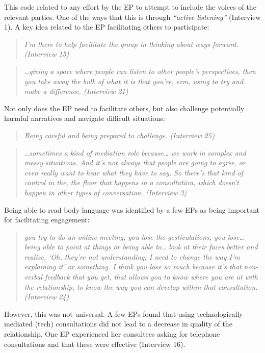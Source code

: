 \documentclass[
  english,
  man]{apa7}
\begin{document}
This code related to any effort by the EP to attempt to include the voices of the relevant parties. One of the ways that this is through \emph{``active listening''} (Interview 1). A key idea related to the EP facilitating others to participate:

\begin{quote}
\emph{I'm there to help facilitate the group in thinking about ways
forward. (Interview 15)}
\end{quote}

\begin{quote}
\emph{\ldots giving a space where people can listen to other people's
perspectives, then you take away the bulk of what it is that you're,
erm, using to try and make a difference. (Interview 21)}
\end{quote}

Not only does the EP need to facilitate others, but also challenge
potentially harmful narratives and navigate difficult situations:

\begin{quote}
\emph{Being careful and being prepared to challenge. (Interview 25)}
\end{quote}

\begin{quote}
\emph{\ldots sometimes a kind of mediation role because\ldots{} we work in complex
and messy situations. And it's not always that people are going to
agree, or even really want to hear what they have to say. So there's
that kind of control in the, the floor that happens in a consultation,
which doesn't happen in other types of conversation. (Interview 3)}
\end{quote}

Being able to read body language was identified by a few EPs as being
important for facilitating engagement:

\begin{quote}
\emph{you try to do an online meeting, you lose the gesticulations, you
lose\ldots{} being able to point at things or being able to\ldots{} look at their faces better and realise, `Oh, they're not
understanding, I need to change the way I'm explaining it' or
something. I think you lose so much because it's that non-verbal
feedback that you get, that allows you to know where you are at with
the relationship, to know the way you can develop within that
consultation. (Interview 24)}
\end{quote}

However, this was not universal. A few EPs found that using technologically-mediated (tech) consultations did not lead to a decrease in quality of the relationship. One EP experienced her consultees asking for telephone consultations and that these were effective (Interview 16).
\end{document}
